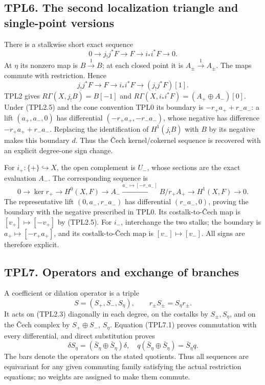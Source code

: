 \subsection{TPL6. The second localization triangle and single-point
versions}\label{tpl6.-the-second-localization-triangle-and-single-point-versions}

There is a stalkwise short exact sequence \[
0\to j_!j^*F\to F\to i_*i^*F\to0.
\tag{TPL6.1}
\] At \(\eta\) its nonzero map is \(B\xrightarrow1B\); at each closed
point it is \(A_\pm\xrightarrow1A_\pm\). The maps commute with
restriction. Hence \[
\boxed{j_!j^*F\to F\to i_*i^*F\to(j_!j^*F)[1].}
\tag{TPL6.2}
\] TPL2 gives \(R\Gamma(X,j_!B)=B[-1]\) and
\(R\Gamma(X,i_*i^*F)=(A_+\oplus A_-)[0]\). Under (TPL2.5) and the cone
convention TPL0 its boundary is \(-r_+a_++r_-a_-\): a lift
\((a_+,a_-,0)\) has differential \((-r_+a_+,-r_-a_-)\), whose negative
has difference \(-r_+a_++r_-a_-\). Replacing the identification of
\(H^1(j_!B)\) with \(B\) by its negative makes this boundary \(d\). Thus
the Čech kernel/cokernel sequence is recovered with an explicit
degree-one sign change.

For \(i_+:\{+\}\hookrightarrow X\), the open complement is \(U_-\),
whose sections are the exact evaluation \(A_-\). The corresponding
sequence is \[
0\to\ker r_+\to H^0(X,F)\to A_-
\xrightarrow{a_-\mapsto[-r_-a_-]}B/r_+A_+
\to H^1(X,F)\to0.
\tag{TPL6.3}
\] The representative lift \((0,a_-,r_-a_-)\) has differential
\((r_-a_-,0)\), proving the boundary with the negative prescribed in
TPL0. Its costalk-to-Čech map is \([v_+]\mapsto[-v_+]\) by (TPL2.5). For
\(i_-\), interchange the two stalks; the boundary is
\(a_+\mapsto[-r_+a_+]\), and its costalk-to-Čech map is
\([v_-]\mapsto[v_-]\). All signs are therefore explicit.

\subsection{TPL7. Operators and exchange of
branches}\label{tpl7.-operators-and-exchange-of-branches}

A coefficient or dilation operator is a triple \[
S=(S_+,S_-,S_\eta),\qquad r_\pm S_\pm=S_\eta r_\pm.
\tag{TPL7.1}
\] It acts on (TPL2.3) diagonally in each degree, on the costalks by
\(S_\pm,S_\eta\), and on the Čech complex by \(S_+\oplus S_-\),
\(S_\eta\). Equation (TPL7.1) proves commutation with every
differential, and direct substitution proves \[
\delta S_\eta=(\bar S_\eta\oplus\bar S_\eta)\delta,
\quad q(\bar S_\eta\oplus\bar S_\eta)=\bar S_\eta q.
\tag{TPL7.2}
\] The bars denote the operators on the stated quotients. Thus all
sequences are equivariant for any given commuting family satisfying the
actual restriction equations; no weights are assigned to make them
commute.

